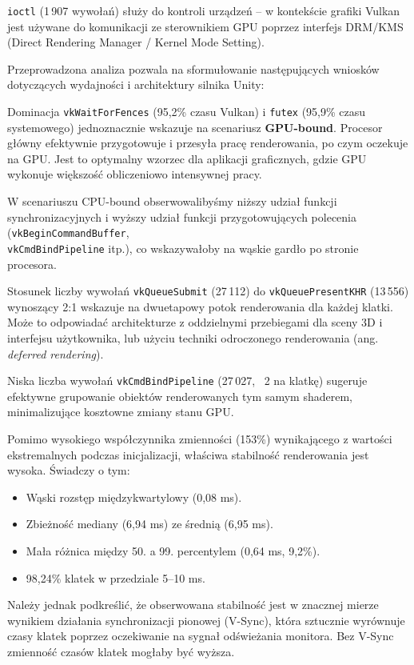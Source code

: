 \texttt{ioctl} (1\,907 wywołań) służy do kontroli urządzeń -- w kontekście grafiki Vulkan jest 
używane do komunikacji ze sterownikiem GPU poprzez
interfejs DRM/KMS (Direct Rendering Manager / Kernel Mode Setting).


Przeprowadzona analiza pozwala na sformułowanie następujących wniosków dotyczących wydajności i architektury silnika Unity:


Dominacja \texttt{vkWaitForFences} (95,2\% czasu Vulkan) i \texttt{futex} (95,9\% czasu systemowego) 
jednoznacznie wskazuje na scenariusz 
\textbf{GPU-bound}. Procesor główny efektywnie przygotowuje i przesyła pracę renderowania, po czym oczekuje na GPU. Jest to optymalny wzorzec dla 
aplikacji graficznych, gdzie GPU wykonuje większość obliczeniowo intensywnej pracy.

W scenariuszu CPU-bound obserwowalibyśmy niższy udział funkcji 
synchronizacyjnych i wyższy udział 
funkcji przygotowujących polecenia
(\texttt{vkBeginCommandBuffer}, \\ \texttt{vkCmdBindPipeline} itp.), co wskazywałoby na wąskie gardło po stronie procesora.


Stosunek liczby wywołań \texttt{vkQueueSubmit} (27\,112) do \texttt{vkQueuePresentKHR} (13\,556) wynoszący 2:1 wskazuje na dwuetapowy potok 
renderowania dla każdej klatki. Może to odpowiadać architekturze z oddzielnymi przebiegami dla sceny 3D i interfejsu użytkownika, lub użyciu techniki 
odroczonego renderowania (ang. \textit{deferred rendering}).

Niska liczba wywołań \texttt{vkCmdBindPipeline} (27\,027, ~2 na klatkę) 
sugeruje efektywne grupowanie obiektów renderowanych tym samym shaderem,
minimalizujące kosztowne zmiany stanu GPU.


Pomimo wysokiego współczynnika zmienności (153\%) wynikającego z wartości ekstremalnych podczas 
inicjalizacji, właściwa stabilność renderowania jest
wysoka. Świadczy o tym:
\begin{itemize}
    \item Wąski rozstęp międzykwartylowy (0,08 ms).
    \item Zbieżność mediany (6,94 ms) ze średnią (6,95 ms).
    \item Mała różnica między 50. a 99. percentylem (0,64 ms, 9,2\%).
    \item 98,24\% klatek w przedziale 5--10 ms.
\end{itemize}

Należy jednak podkreślić, że obserwowana stabilność jest w znacznej mierze wynikiem 
działania synchronizacji pionowej (V-Sync), która sztucznie
wyrównuje czasy klatek poprzez oczekiwanie na sygnał odświeżania monitora. Bez V-Sync 
zmienność czasów klatek mogłaby być wyższa.



